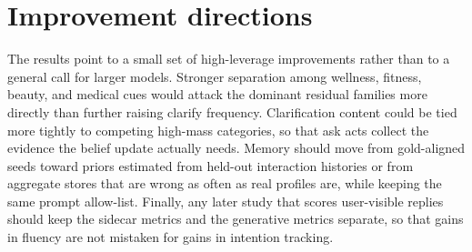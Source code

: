 \section{Improvement directions}
\label{sec:discussion-improvements}

The results point to a small set of high-leverage improvements rather than to a general call for larger models.
Stronger separation among wellness, fitness, beauty, and medical cues would attack the dominant residual families more directly than further raising clarify frequency.
Clarification content could be tied more tightly to competing high-mass categories, so that ask acts collect the evidence the belief update actually needs.
Memory should move from gold-aligned seeds toward priors estimated from held-out interaction histories or from aggregate stores that are wrong as often as real profiles are, while keeping the same prompt allow-list.
Finally, any later study that scores user-visible replies should keep the sidecar metrics and the generative metrics separate, so that gains in fluency are not mistaken for gains in intention tracking.

